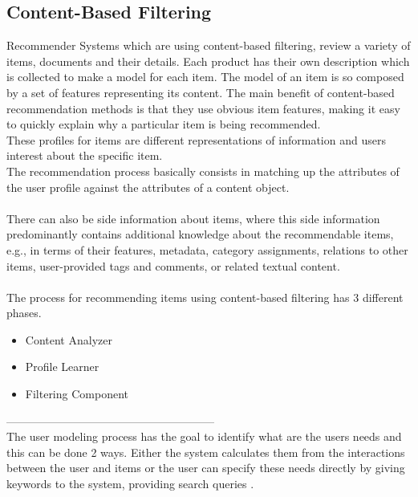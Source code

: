 \documentclass[10pt,oneside,english,a4paper]{article}
\begin{document}
\subsection{Content-Based Filtering}
Recommender Systems which are using content-based filtering, review a variety of items, documents and their details. Each product has their own description which is collected to make a model for each item. The model of an item is so composed by a set of features representing its content. The main benefit of content-based recommendation methods is that they use obvious item features, making it easy to quickly explain why a particular item is being recommended. \cite{pub.1034486657}\\
These profiles for items are different representations of information and users interest about the specific item. \\
The recommendation process basically consists in matching
up the attributes of the user profile against the attributes of a content object.
\cite{pub.1034486657}\\\\
There can also be side information about items, where this side information predominantly contains additional knowledge about the recommendable items, e.g., in terms of their features, metadata, category assignments, relations to other items, user-provided tags and comments, or related textual content. \cite{Lops2019239}\\\\
The process for recommending items using content-based filtering has 3 different phases.
\begin{itemize}
\item Content Analyzer
\item Profile Learner
\item Filtering Component
\end{itemize}
%
%
%
%
%
%
%
--------------------------------------------------------\\
The user modeling process has the goal to identify what are the users needs and this can be done 2 ways. Either the system calculates them from the interactions between the user and items or the user can specify these needs directly by giving keywords to the system, providing search queries \cite{Beel2016305}. \\
\end{document}

